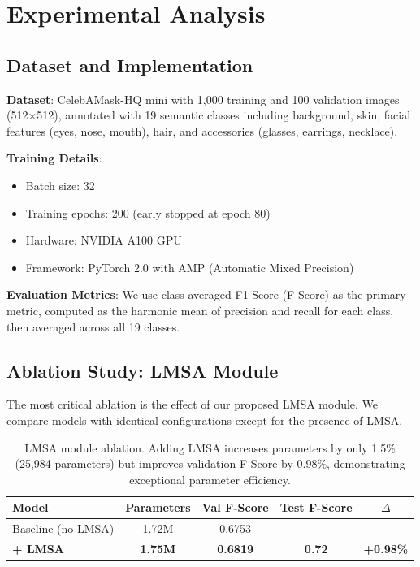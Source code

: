 \section{Experimental Analysis}
\label{sec:experiments}

\subsection{Dataset and Implementation}

\textbf{Dataset}: CelebAMask-HQ mini with 1,000 training and 100 validation images (512×512), annotated with 19 semantic classes including background, skin, facial features (eyes, nose, mouth), hair, and accessories (glasses, earrings, necklace).

\textbf{Training Details}:
\begin{itemize}
    \item Batch size: 32
    \item Training epochs: 200 (early stopped at epoch 80)
    \item Hardware: NVIDIA A100 GPU
    \item Framework: PyTorch 2.0 with AMP (Automatic Mixed Precision)
\end{itemize}

\textbf{Evaluation Metrics}: We use class-averaged F1-Score (F-Score) as the primary metric, computed as the harmonic mean of precision and recall for each class, then averaged across all 19 classes.

\subsection{Ablation Study: LMSA Module}

The most critical ablation is the effect of our proposed LMSA module. We compare models with identical configurations except for the presence of LMSA.

\begin{table}[h]
\centering
\small
\begin{tabular}{lcccc}
\hline
Model & Parameters & Val F-Score & Test F-Score & $\Delta$ \\
\hline
Baseline (no LMSA) & 1.72M & 0.6753 & - & - \\
\textbf{+ LMSA} & \textbf{1.75M} & \textbf{0.6819} & \textbf{0.72} & \textbf{+0.98\%} \\
\hline
\end{tabular}
\caption{LMSA module ablation. Adding LMSA increases parameters by only 1.5\% (25,984 parameters) but improves validation F-Score by 0.98\%, demonstrating exceptional parameter efficiency.}
\end{table}

